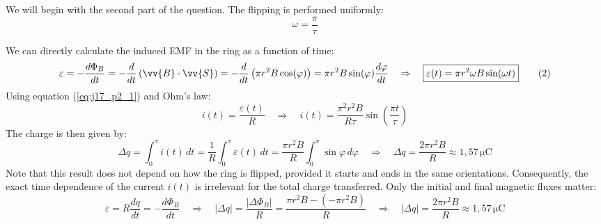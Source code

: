\newpage
{}
We will begin with the second part of the question. The flipping is performed uniformly:
\begin{equation*}
	\boxed{\omega = \frac{\pi}{\tau}}
	\tag{$1$}
	\label{eq:j17_p2_1}
\end{equation*}



We can directly calculate the induced EMF in the ring as a function of time:
\begin{equation*}
	\varepsilon 
	= 
	-\frac{d\Phi_B}{dt}
	=
	- \frac{d}{dt}
	\left(
	\vv{B} \cdot \vv{S}
	\right)
	=
	-\frac{d}{dt}
	\left(
	\pi r^2 B \cos(\varphi)
	\right)
	=
	\pi r^2 B \sin(\varphi) \frac{d\varphi}{dt}
	\quad\Rightarrow\quad
	\boxed{
	\varepsilon(t)
	=
	\pi r^2 \omega B \sin(\omega t)
	}
	\tag{$2$}
	\label{eq:j17_p2_2}
\end{equation*}
Using equation (\ref{eq:j17_p2_1}) and Ohm's law:
\begin{equation*}
	i(t) = \frac{\varepsilon(t)}{R}
	\quad\Rightarrow\quad
	\boxed{i(t) = \frac{\pi^2 r^2 B}{R\tau} \sin\left(\frac{\pi t}{\tau}\right)}
	\tag{$3$}
	\label{eq:j17_p2_3}
\end{equation*}
The charge is then given by:
\begin{equation*}
	\Delta q
	=
	\int_0^\tau i(t)\,dt
	=
	\frac{1}{R}
	\int_0^\tau \varepsilon(t)\,dt
	=
	\frac{\pi r^2 B}{R}
	\int_0^\pi \sin\varphi\,d\varphi
	\quad\Rightarrow\quad
	\boxed{
		\Delta q 
		= 
		\frac{2\pi r^2 B}{R} 
		\approx 1{,}57\,\mathrm{\mu C}
		}
	\tag{$4$}
	\label{eq:j17_p2_4}
\end{equation*}
Note that this result does not depend on how the ring is flipped, provided it starts and ends in the same orientations. Consequently, the exact time dependence of the current  $i(t)$ is irrelevant for the total charge transferred. Only the initial and final magnetic fluxes matter:
\begin{equation*}
	\varepsilon = R \frac{dq}{dt} = - \frac{d\Phi_B}{dt}
	\quad\Rightarrow\quad
	\left|\Delta q \right|
	= 
	\frac{\left| \Delta \Phi_B \right|}{R} = 
	\frac{\pi r^2 B - (- \pi r^2 B)}{R}
	\quad\Rightarrow\quad
	\boxed{
		\left| \Delta q \right|
		= 
		\frac{2\pi r^2 B}{R} 
		\approx 1{,}57\,\mathrm{\mu C}
	}
\end{equation*}